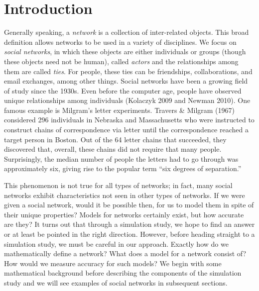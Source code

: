 \documentclass[12pt,twoside]{amherstthesis}
\begin{document}
  
  \mainmatter %
  \pagestyle{fancyplain} %

  \onehalfspacing
  
  \chapter*{Introduction}\label{introduction}
  
  Generally speaking, a \emph{network} is a collection of inter-related
  objects. This broad definition allows networks to be used in a variety
  of disciplines. We focus on \emph{social networks}, in which these
  objects are either individuals or groups (though these objects need not
  be human), called \emph{actors} and the relationships among them are
  called \emph{ties}. For people, these ties can be friendships,
  collaborations, and email exchanges, among other things. Social networks
  have been a growing field of study since the 1930s. Even before the
  computer age, people have observed unique relationships among
  individuals (Kolaczyk 2009 and Newman 2010). One famous example is
  Milgram's letter experiments. Travers \& Milgram (1967) considered 296
  individuals in Nebraska and Massachusetts who were instructed to
  construct chains of correspondence via letter until the correspondence
  reached a target person in Boston. Out of the 64 letter chains that
  succeeded, they discovered that, overall, these chains did not require
  that many people. Surprisingly, the median number of people the letters
  had to go through was approximately six, giving rise to the popular term
  ``six degrees of separation.''
  
  This phenomenon is not true for all types of networks; in fact, many
  social networks exhibit characteristics not seen in other types of
  networks. If we were given a social network, would it be possible then,
  for us to model them in spite of their unique properties? Models for
  networks certainly exist, but how accurate are they? It turns out that
  through a simulation study, we hope to find an answer or at least be
  pointed in the right direction. However, before heading straight to a
  simulation study, we must be careful in our approach. Exactly how do we
  mathematically define a network? What does a model for a network consist
  of? How would we measure accuracy for such models? We begin with some
  mathematical background before describing the components of the
  simulation study and we will see examples of social networks in
  subsequent sections.
  
\end{document}
